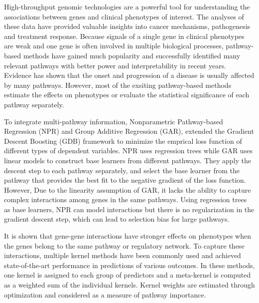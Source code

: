 \documentclass[a4paper,12pt]{article}
\begin{document}
High-throughput genomic technologies are a powerful tool for understanding the associations between genes and clinical phenotypes of interest. The analyses of these data have provided valuable insights into cancer mechanisms, pathogenesis and treatment response. Because signals of a single gene in clinical phenotypes are weak and one gene is often involved in multiple biological processes, pathway-based methods have gained much popularity and successfully identified many relevant pathways with better power and interpretability in recent years.\cite{subramanian2005gene, ramanan2012pathway} Evidence has shown that the onset and progression of a disease is usually affected by many pathways.\cite{shou2004mechanisms, shtivelman2014molecular, berk2009neuroprogression} However, most of the exsiting pathway-based methods estimate the effects on phenotypes or evaluate the statistical significance of each pathway separately.\cite{subramanian2005gene,liu2007semiparametric,wu2011rare}

To integrate multi-pathway information, Nonparametric Pathway-based Regression (NPR)\cite{wei2007nonparametric} and Group Additive Regression (GAR),\cite{luan2007group} extended the Gradient Descent Boosting (GDB)\cite{friedman2001greedy} framework to minimize the emprical loss function of different types of dependent variables. NPR uses regression trees while GAR uses linear models to construct base learners from different pathways. They apply the descent step to each pathway separately, and select the base learner from the pathway that provides the best fit to the negative gradient of the loss function. However, Due to the linearity assumption of GAR, it lacks the ability to capture complex interactions among genes in the same pathways. Using regression trees as base learners, NPR can model interactions but there is no regularization in the gradient descent step, which can lead to selection bias for large pathways.

It is shown that gene-gene interactions have stronger effects on phenotypes when the genes belong to the same pathway or regulatory network.\cite{carlson2004mapping} To capture these interactions, multiple kernel methods have been commonly used and achieved state-of-the-art performance in predictions of various outcomes.\cite{gonen2014drug,costello2014community, aiolli2015easymkl,friedrichs2017pathway, manica2019pimkl} In these methods, one kernel is assigned to each group of predictors and a meta-kernel is computed as a weighted sum of the individual kernels. Kernel weights are estimated through optimization and considered as a measure of pathway importance. 
\end{document}
